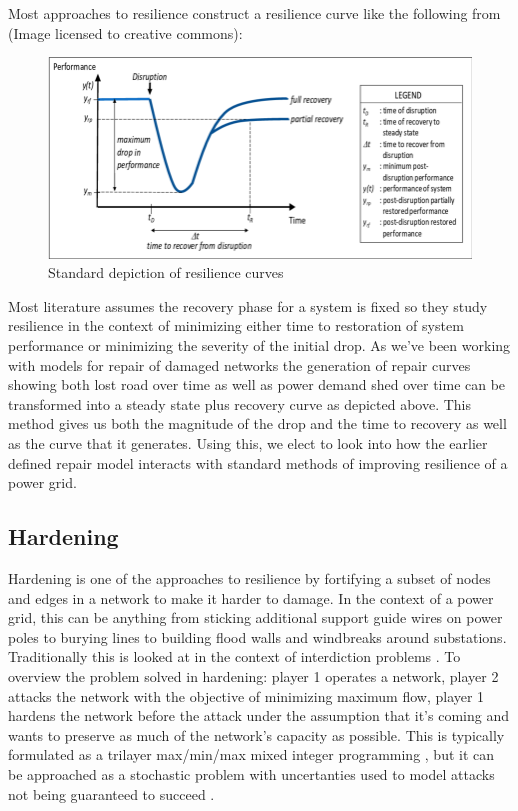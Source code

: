 \documentclass{article}
\begin{document}
	Most approaches to resilience construct a resilience curve like the following from \cite{Madni2020} (Image licensed to creative commons):
	
	\begin{figure}[htbp]
	\centering
	\includegraphics[width=.9\linewidth]{resiliencecurve.png}
	\caption{Standard depiction of resilience curves}
	\end{figure}
	
	Most literature assumes the recovery phase for a system is fixed so they study resilience in the context of minimizing either time to restoration of system performance or minimizing the severity of the initial drop. As we've been working with models for repair of damaged networks the generation of repair curves showing both lost road over time as well as power demand shed over time can be transformed into a steady state plus recovery curve as depicted above. This method gives us both the magnitude of the drop and the time to recovery as well as the curve that it generates. Using this, we elect to look into how the earlier defined repair model interacts with standard methods of improving resilience of a power grid.
	
	\subsection{Hardening}
	
	Hardening is one of the approaches to resilience by fortifying a subset of nodes and edges in a network to make it harder to damage. In the context of a power grid, this can be anything from sticking additional support guide wires on power poles to burying lines to building flood walls and windbreaks around substations. Traditionally this is looked at in the context of interdiction problems \cite{ChurchEA2007}. To overview the problem solved in hardening: player 1 operates a network, player 2 attacks the network with the objective of minimizing maximum flow, player 1 hardens the network before the attack under the assumption that it's coming and wants to preserve as much of the network's capacity as possible. This is typically formulated as a trilayer max/min/max mixed integer programming \cite{Mahmoo2016}, but it can be approached as a stochastic problem with uncertanties used to model attacks not being guaranteed to succeed \cite{Ramirez2009}.
	
\end{document}
